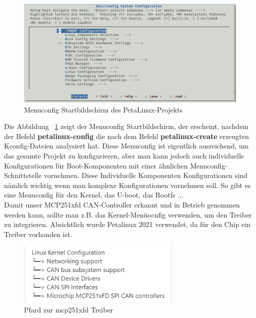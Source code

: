\begin{figure}[H]
	\begin{center}		\includegraphics[width=1\textwidth]{./images/petalinux_config.jpg}
	\end{center}
	\vspace{-5pt}
	\caption[Menuconfig Startbildschirm des PetaLinux-Projekts]{Menuconfig Startbildschirm des PetaLinux-Projekts} %
	\label{fig:menuconfig}
	\vspace{-5pt}
\end{figure}

Die Abbildung ~\ref{fig:menuconfig} zeigt der Menuconfig Startbildschirm, der erscheint, nachdem der Befehl \textbf{petalinux-config} die nach dem Befehl \textbf{petalinux-create} erzeugten Kconfig-Dateien analysiert hat. Diese Menuconfig ist eigentlich ausreichend, um das gesamte Projekt zu konfigurieren, aber man kann jedoch auch individuelle Konfigurationen für Boot-Komponenten mit einer ähnlichen Menuconfig-Schnittstelle vornehmen. Diese Individuelle Komponenten Konfigurationen sind nämlich wichtig wenn man  komplexe Konfigurationen vornehmen soll. So gibt es eine Menuconfig für den Kernel, das U-boot, das Rootfs ...\\
Damit unser MCP251xfd CAN-Controller erkannt und in Betrieb genommen werden kann, sollte man z.B. das Kernel-Menüocnfig verwenden, um den Treiber zu integrieren. Absichtlich wurde Petalinux 2021 verwendet, da für den Chip ein Treiber vorhanden ist. 

\begin{figure}[H]
	\begin{center}		\includegraphics[width=0.7\textwidth]{./images/mcp_driver_pfard.jpg}
	\end{center}
	\vspace{-5pt}
	\caption[Pfard zur mcp251xfd Treiber]{Pfard zur mcp251xfd Treiber} %
	\label{fig:mcp:treiber:pfard}
	\vspace{-5pt}
\end{figure}

